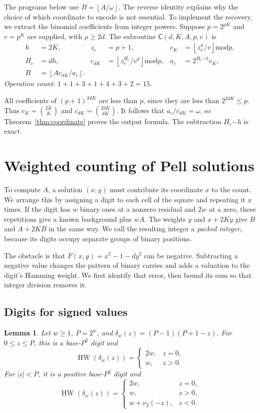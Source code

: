 \documentclass[11pt]{article}
\newtheorem{lemma}[theorem]{Lemma}
\theoremstyle{remark}
\newcommand{\tsub}{\mathbin{\dot{-}}}
\newcommand{\md}{\mathbin{\mathrm{mod}}}
\newcommand{\fl}[1]{\left\lfloor #1\right\rfloor}
\newcommand{\HW}{\operatorname{HW}}
\newcommand{\Coord}{\mathsf{C}}
\begin{document}
The programs below use $B=\fl{A/\omega}$. The reverse identity explains
why the choice of which coordinate to encode is not essential.
To implement the recovery, we extract the binomial coefficients from
integer powers. Suppose $p=2^{\rho K}$ and $v=p^K$ are supplied, with
$\rho\ge2d$. The subroutine $\Coord(d,K,A,p,v)$ is
\begin{align*}
  h&=2K,& z_c&=p+1,& c_K&=\fl{z_c^h/v}\md p,\\
  H_c&=dh,& c_{dK}&=\fl{z_c^{H_c}/v^d}\md p,&
  a_c&=2^{H_c\tsub h}c_K,\\
  B&=\fl{A c_{dK}/a_c}.&&&&
\end{align*}
\emph{Operation count:} $1+1+3+1+4+3+2=15$.

All coefficients of $(p+1)^{2dK}$ are less than $p$, since they are
less than $2^{2dK}\le p$. Thus
$c_K=\binom{2K}{K}$ and $c_{dK}=\binom{2dK}{dK}$.
It follows that $a_c/c_{dK}=\omega$, so Theorem~\ref{thm:coordinate}
proves the output formula. The subtraction $H_c\tsub h$ is exact.

\section{Weighted counting of Pell solutions}\label{sec:counting}

To compute $A$, a solution $(x,y)$ must contribute its coordinate $x$
to the count. We arrange this by assigning a digit to each cell of the
square and repeating it $x$ times. If the digit has $w$ binary ones at a
nonzero residual and $2w$ at a zero, these repetitions give a known
background plus $wA$. The weights $y$ and $x+2Ky$ give $B$ and $A+2KB$
in the same way. We call the resulting integer a \emph{packed integer},
because its digits occupy separate groups of binary positions.

The obstacle is that $F(x,y)=x^2-1-dy^2$ can be negative. Subtracting a
negative value changes the pattern of binary carries and adds a valuation
to the digit's Hamming weight. We first identify that error, then bound
its sum so that integer division removes it.

\subsection{Digits for signed values}

\begin{lemma}\label{lem:digits}
Let $w\ge1$, $P=2^w$, and
$\delta_w(z)=(P-1)(P+1-z)$.
For $0\le z\le P$, this is a base-$P^2$ digit and
\[
  \HW(\delta_w(z))=
  \begin{cases}2w,&z=0,\\w,&z>0.\end{cases}
\]
For $|z|<P$, it is a positive base-$P^3$ digit and
\begin{equation}\label{eq:signed-digit}
  \HW(\delta_w(z))=
  \begin{cases}
    2w,&z=0,\\
    w,&z>0,\\
    w+\nu_2(-z),&z<0.
  \end{cases}
\end{equation}
\end{lemma}
\end{document}
